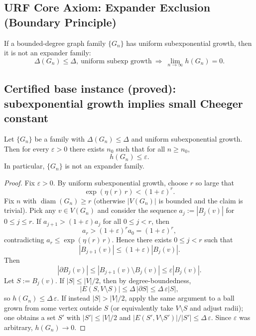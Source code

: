 \subsection{URF Core Axiom: Expander Exclusion (Boundary Principle)}
\begin{axiom}
If a bounded-degree graph family $\{G_n\}$ has uniform subexponential growth, then it is not an expander family:
\[
\Delta(G_n)\le \Delta,\ \text{uniform subexp growth}\ \Longrightarrow\ \lim_{n\to\infty} h(G_n)=0.
\]
\end{axiom}

\subsection{Certified base instance (proved): subexponential growth implies small Cheeger constant}
\begin{theorem}\label{thm:subexp-noexp}
Let $\{G_n\}$ be a family with $\Delta(G_n)\le \Delta$ and uniform subexponential growth.
Then for every $\varepsilon>0$ there exists $n_0$ such that for all $n\ge n_0$,
\[
h(G_n)\le \varepsilon.
\]
In particular, $\{G_n\}$ is not an expander family.
\end{theorem}

\begin{proof}
Fix $\varepsilon>0$.
By uniform subexponential growth, choose $r$ so large that
\[
\exp(\eta(r)\,r) < (1+\varepsilon)^{r}.
\]
Fix $n$ with $\operatorname{diam}(G_n)\ge r$ (otherwise $|V(G_n)|$ is bounded and the claim is trivial).
Pick any $v\in V(G_n)$ and consider the sequence $a_j:=|B_j(v)|$ for $0\le j\le r$.
If $a_{j+1}>(1+\varepsilon)a_j$ for all $0\le j<r$, then
\[
a_r>(1+\varepsilon)^r a_0=(1+\varepsilon)^r,
\]
contradicting $a_r\le \exp(\eta(r)\,r)$.
Hence there exists $0\le j<r$ such that
\[
|B_{j+1}(v)|\le (1+\varepsilon)|B_j(v)|.
\]
Then
\[
|\partial B_j(v)|\le |B_{j+1}(v)\setminus B_j(v)|\le \varepsilon |B_j(v)|.
\]
Let $S:=B_j(v)$. If $|S|\le |V|/2$, then by degree-boundedness,
\[
|E(S,V\setminus S)|\le \Delta\,|\partial S|\le \Delta\,\varepsilon |S|,
\]
so $h(G_n)\le \Delta\,\varepsilon$.
If instead $|S|>|V|/2$, apply the same argument to a ball grown from some vertex outside $S$
(or equivalently take $V\setminus S$ and adjust radii); one obtains a set $S'$ with $|S'|\le |V|/2$
and $|E(S',V\setminus S')|/|S'|\le \Delta\,\varepsilon$.
Since $\varepsilon$ was arbitrary, $h(G_n)\to 0$.
\end{proof}

